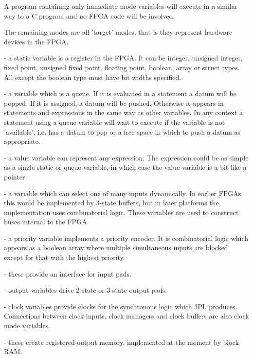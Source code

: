         A program containing only immediate mode variables will execute in a similar way to
        a C program and no FPGA code will be involved.

        The remaining modes are all 'target' modes, that is they represent hardware devices
        in the FPGA.

         - a static variable is a register in the FPGA. It can be integer, unsigned
        integer, fixed point, unsigned fixed point, floating point, boolean, array or struct
        types. All except the boolean type must have bit widths specified.

         - a variable which is a queue. If it is evaluated in a statement a datum
        will be popped. If it is assigned, a datum will be pushed. Otherwise it appears in
        statements and expressions in the same way as other variables. In any context a
        statement using a queue variable will wait to execute if the variable is not
        'available', i.e. has a datum to pop or a free space in which to push a datum as
        appropriate.

         - a value variable can represent any expression. The expression could be
        as simple as a single static or queue variable, in which case the value variable is a bit
        like a pointer.

         - a variable which can select one of many inputs dynamically. In earlier
        FPGAs this would be implemented by 3-state buffers, but in later platforms the
        implementation uses combinatorial logic. These variables are used to construct buses
        internal to the FPGA.

         - a priority variable implements a priority encoder. It is combinatorial
        logic which appears as a boolean array where multiple simultaneous inputs are blocked
        except for that with the highest priority.

         - these provide an interface for input pads.

         - output variables drive 2-state or 3-state output pads.

         - clock variables provide clocks for the synchronous logic which 3PL produces.
        Connections between clock inputs, clock managers and clock buffers are also clock mode
        variables.

         - these create registered-output memory, implemented at the moment by
        block RAM.

